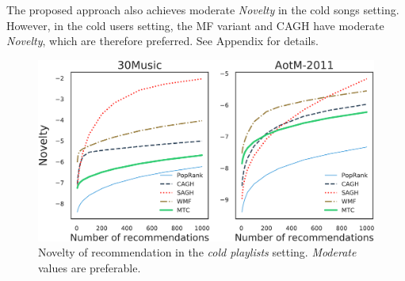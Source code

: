 The proposed approach also achieves moderate \emph{Novelty} in the cold songs setting.
However, in the cold users setting, the MF variant and CAGH have moderate \emph{Novelty},
which are therefore preferred. See Appendix for details.


%



\begin{figure}[!t]
    \centering
    \includegraphics[width=\columnwidth]{fig/nov3.pdf}
    \caption{Novelty of recommendation in the \emph{cold playlists} setting.
\emph{Moderate} values are preferable.}
    \label{fig:nov3}
\end{figure}


